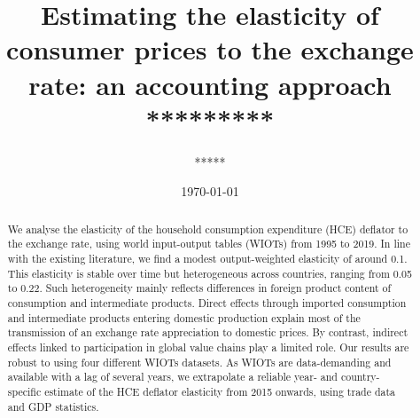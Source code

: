 \documentclass[11pt,a4paper]{paper} %
\begin{document}
\title{Estimating the elasticity of consumer prices to the exchange rate: an accounting approach	********* \\
\vspace{1cm}
}
\vspace{1cm}
\date{\today}
\author{
	*****
}
\maketitle


\begin{abstract}
{\small \noindent
We analyse the elasticity of the household consumption expenditure (HCE) deflator to the exchange rate, using world input-output tables (WIOTs) from 1995 to 2019. 
In line with the existing literature, we find a modest output-weighted elasticity of around 0.1.
This elasticity is stable over time but heterogeneous across countries, ranging from 0.05 to 0.22. 
Such heterogeneity mainly reflects differences in foreign product content of consumption and intermediate products. 
Direct effects through imported consumption and intermediate products entering domestic production explain most of the transmission of an exchange rate appreciation to domestic prices.
By contrast, indirect effects linked to participation in global value chains play a limited role. 
Our results are robust to using four different WIOTs datasets. 
As WIOTs are data-demanding and available with a lag of several years, we extrapolate a reliable year- and country-specific estimate of the HCE deflator elasticity from 2015 onwards, using trade data and GDP statistics. 


		
}
\end{abstract}
\end{document}
